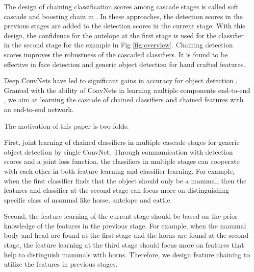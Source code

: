 \documentclass[10pt,twocolumn,letterpaper]{article}
\begin{document}
The design of chaining classification scores among cascade stages is called soft cascade \cite{bourdev2005robust} and boosting chain in \cite{xiao2003boosting}. In these approaches, the detection scores in the previous stages are added to the detection scores in the current stage. With this design, the confidence for the antelope at the first stage is used for the classifier in the second stage for the example in Fig \ref{fig:overview}. Chaining detection scores improves the robustness of the cascaded classifiers.
It is found to be effective in face detection \cite{bourdev2005robust, xiao2003boosting} and generic object detection \cite{Pedersoli:C2FObj2, Felzenszwalb:cascade10} for hand crafted features. 

Deep ConvNets have led to significant gains in accuracy for object detection \cite{girshick2014rich, girshick2015fast}. Granted with the ability of ConvNets in learning multiple components end-to-end \cite{wan2015end}, we aim at learning the cascade of chained classifiers and chained features with an end-to-end network.



The motivation of this paper is two folds:

First, joint learning of chained classifiers in multiple cascade stages for generic object detection by single ConvNet. Through communication with detection scores and a joint loss function, the classifiers in multiple stages can cooperate with each other in both feature learning and classifier learning. For example, when the first classifier finds that the object should only be a mammal, then the features and classifier at the second stage can focus more on distinguishing specific class of mammal like horse, antelope and cattle. 

Second, the feature learning of the current stage should be based on the prior knowledge of the features in the previous stage. For example, when the mammal body and head are found at the first stage and the horns are found at the second stage, the feature learning at the third stage should focus more on features that help to distinguish mammals with horns. Therefore, we design feature chaining to utilize the features in previous stages.
\end{document}
